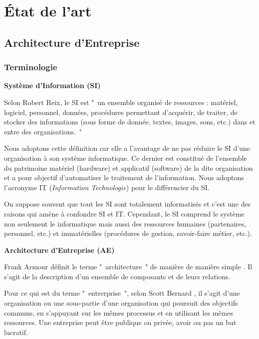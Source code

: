 \chapter{État de l'art}
\label{chap:Etat de l'art}

\section{Architecture d'Entreprise}

\subsection{Terminologie}

\textbf{Système d'Information (SI)}

Selon Robert Reix, le SI est "~un ensemble organisé de ressources : matériel, 
logiciel, personnel, données, procédures permettant d'acquérir, de traiter, de 
stocker des informations (sous forme de donnée, textes, images, sons, etc.) dans 
et entre des organisations.~"

Nous adoptons cette définition car elle a l'avantage de ne pas réduire le SI 
d'une organisation à son système informatique. Ce dernier est constitué de 
l'ensemble du patrimoine matériel (hardware) et applicatif (software) de la dite 
organisation et a pour objectif d'automatiser le traitement de l'information. 
Nous adoptons l'acronyme IT (\textit{Information Technologie}) pour le 
différencier du SI.

On suppose souvent que tout les SI sont totalement informatisés et c'est une des 
raisons qui amène à confondre SI et IT. Cependant, le SI comprend le système non 
seulement le informatique mais aussi des ressources humaines (partenaires, 
personnel, etc.) et immatérielles (procédures de gestion, savoir-faire métier, 
etc.).



\textbf{Architecture d'Entreprise  (AE)}

Frank Armour définit le terme "~architecture~" de manière de manière simple 
\cite{armour1999bigpicture}. Il s'agit de la description d'un ensemble de 
composants et de leurs relations.

Pour ce qui est du terme "~entrerprise~", selon Scott Bernard 
\cite{bernard2012introduction}, il s'agit d'une 
organisation ou une sous-partie d'une organisation qui poursuit des objectifs 
communs, en s'appuyant sur les mêmes processus et en utilisant les mêmes 
ressources. Une entreprise peut être publique ou privée, avoir ou pas un but 
lucratif. 

